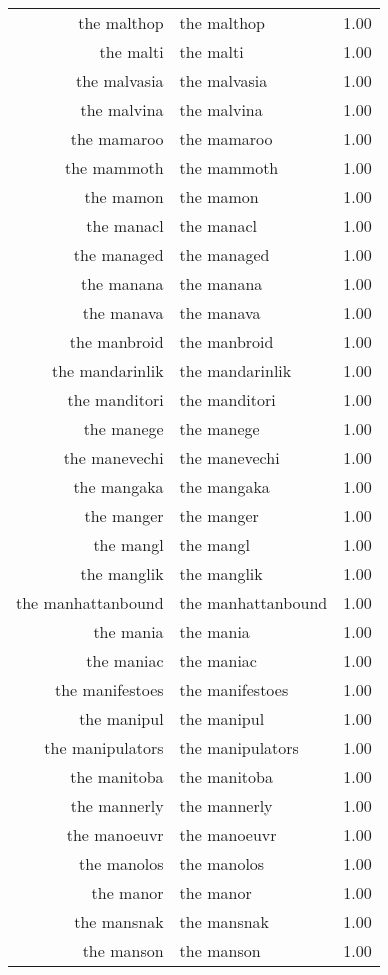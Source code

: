 \begin{table}[ht]
\begin{tabular}{rlr}
  the malthop & the malthop & 1.00 \\ 
  the malti & the malti & 1.00 \\ 
  the malvasia & the malvasia & 1.00 \\ 
  the malvina & the malvina & 1.00 \\ 
  the mamaroo & the mamaroo & 1.00 \\ 
  the mammoth & the mammoth & 1.00 \\ 
  the mamon & the mamon & 1.00 \\ 
  the manacl & the manacl & 1.00 \\ 
  the managed & the managed & 1.00 \\ 
  the manana & the manana & 1.00 \\ 
  the manava & the manava & 1.00 \\ 
  the manbroid & the manbroid & 1.00 \\ 
  the mandarinlik & the mandarinlik & 1.00 \\ 
  the manditori & the manditori & 1.00 \\ 
  the manege & the manege & 1.00 \\ 
  the manevechi & the manevechi & 1.00 \\ 
  the mangaka & the mangaka & 1.00 \\ 
  the manger & the manger & 1.00 \\ 
  the mangl & the mangl & 1.00 \\ 
  the manglik & the manglik & 1.00 \\ 
  the manhattanbound & the manhattanbound & 1.00 \\ 
  the mania & the mania & 1.00 \\ 
  the maniac & the maniac & 1.00 \\ 
  the manifestoes & the manifestoes & 1.00 \\ 
  the manipul & the manipul & 1.00 \\ 
  the manipulators & the manipulators & 1.00 \\ 
  the manitoba & the manitoba & 1.00 \\ 
  the mannerly & the mannerly & 1.00 \\ 
  the manoeuvr & the manoeuvr & 1.00 \\ 
  the manolos & the manolos & 1.00 \\ 
  the manor & the manor & 1.00 \\ 
  the mansnak & the mansnak & 1.00 \\ 
  the manson & the manson & 1.00 \\ 

\end{tabular}
\end{table}
